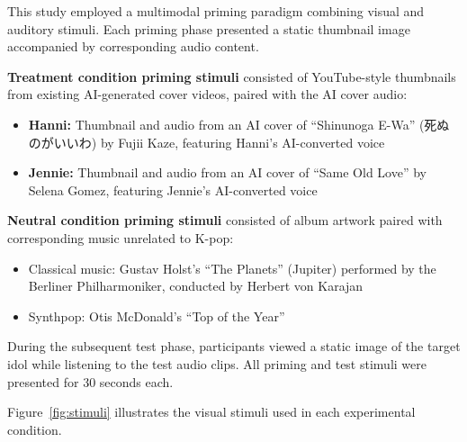 \documentclass[12pt, a4paper]{article}
\begin{document}
This study employed a multimodal priming paradigm combining visual and auditory stimuli. Each priming phase presented a static thumbnail image accompanied by corresponding audio content.

\textbf{Treatment condition priming stimuli} consisted of YouTube-style thumbnails from existing AI-generated cover videos, paired with the AI cover audio:
\begin{itemize}
    \item \textbf{Hanni:} Thumbnail and audio from an AI cover of ``Shinunoga E-Wa'' (死ぬのがいいわ) by Fujii Kaze, featuring Hanni's AI-converted voice
    \item \textbf{Jennie:} Thumbnail and audio from an AI cover of ``Same Old Love'' by Selena Gomez, featuring Jennie's AI-converted voice
\end{itemize}

\textbf{Neutral condition priming stimuli} consisted of album artwork paired with corresponding music unrelated to K-pop:
\begin{itemize}
    \item Classical music: Gustav Holst's ``The Planets'' (Jupiter) performed by the Berliner Philharmoniker, conducted by Herbert von Karajan
    \item Synthpop: Otis McDonald's ``Top of the Year''
\end{itemize}

During the subsequent test phase, participants viewed a static image of the target idol while listening to the test audio clips. All priming and test stimuli were presented for 30 seconds each.

Figure~\ref{fig:stimuli} illustrates the visual stimuli used in each experimental condition.
\end{document}

